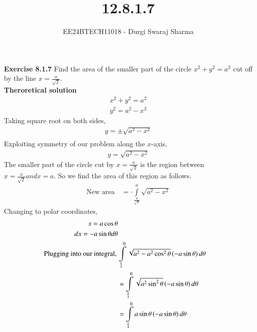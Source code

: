 \documentclass[journal]{IEEEtran}
\begin{document}

\vspace{3cm}

\title{12.8.1.7}
\author{EE24BTECH11018 - Durgi Swaraj Sharma}

{\let\newpage\relax\maketitle}
\renewcommand{\thefigure}{\theenumi}
\renewcommand{\thetable}{\theenumi}
\setlength{\intextsep}{10pt}
\renewcommand{\thetable}{\theenumi}

\textbf{Exercise 8.1.7} Find the area of the smaller part of the circle $x^2+y^2=a^2$ cut off by the line $x=\frac{a}{\sqrt{2}}$.\\
\textbf{Theroretical solution}
\begin{align}
	x^2+y^2=a^2\\
	y^2=a^2-x^2
\end{align}
Taking square root on both sides,
\begin{align}
	y = \pm\sqrt{a^2-x^2}\\
\end{align}
Exploiting symmetry of our problem along the $x$-axis,
\begin{align}
	y = \sqrt{a^2-x^2} \label{eq1}
\end{align}
The smaller part of the circle cut by $x=\frac{a}{\sqrt{2}}$ is the region between $x=\frac{a}{\sqrt{2}} and x = a$. So we find the area of this region as follows.
\begin{align}
	\text{New area}\, &= \cdot\int\limits_{\frac{a}{\sqrt{2}}}^{a} \sqrt{a^2-x^2}
\end{align}
Changing to polar coordinates,
\begin{align}
	x = a \cos\theta\\
	dx = - a \sin\theta d\theta\\
	\text{Plugging into our integral,}\, &\int\limits_{\frac{\pi}{4}}^{0} \sqrt{a^2-a^2 \cos^2\theta} \left(-a \sin\theta\right) d\theta\\
	&= \int\limits_{\frac{\pi}{4}}^{0} \sqrt{a^2 \sin^2\theta} \left(-a \sin\theta\right) d\theta\\
	&= \int\limits_{\frac{\pi}{4}}^{0} a \sin\theta \left(-a \sin\theta\right) d\theta\\
\end{align}
\end{document}
